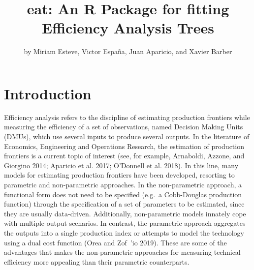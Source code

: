 \title{eat: An R Package for fitting Efficiency Analysis Trees}
\author{by Miriam Esteve, Victor España, Juan Aparicio, and Xavier Barber}

\maketitle


\hypertarget{introduction}{%
\section{Introduction}\label{introduction}}

Efficiency analysis refers to the discipline of estimating production frontiers while measuring the efficiency of a set of observations, named Decision Making Units (DMUs), which use several inputs to produce several outputs. In the literature of Economics, Engineering and Operations Research, the estimation of production frontiers is a current topic of interest (see, for example, Arnaboldi, Azzone, and Giorgino 2014; Aparicio et al. 2017; O'Donnell et al. 2018). In this line, many models for estimating production frontiers have been developed, resorting to parametric and non-parametric approaches. In the non-parametric approach, a functional form does not need to be specified (e.g.~a Cobb-Douglas production function) through the specification of a set of parameters to be estimated, since they are usually data-driven. Additionally, non-parametric models innately cope with multiple-output scenarios. In contrast, the parametric approach aggregates the outputs into a single production index or attempts to model the technology using a dual cost function (Orea and Zof~'io 2019). These are some of the advantages that makes the non-parametric approaches for measuring technical efficiency more appealing than their parametric counterparts.


